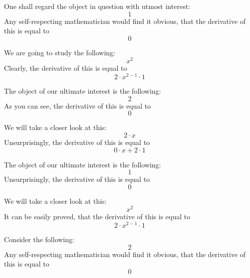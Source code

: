 \documentclass{article}
\begin{document}
One shall regard the object in question with utmost interest:
\begin{equation}
1 
\end{equation}
Any self-respecting mathematician would find it obvious, that the derivative of this is equal to
\begin{equation}
0 
\end{equation}

We are going to study the following:
\begin{equation}
x ^{2 } 
\end{equation}
Clearly, the derivative of this is equal to
\begin{equation}
2 \cdot x ^{2 - 1 } \cdot 1 
\end{equation}

The object of our ultimate interest is the following:
\begin{equation}
2 
\end{equation}
As you can see, the derivative of this is equal to
\begin{equation}
0 
\end{equation}

We will take a closer look at this:
\begin{equation}
2 \cdot x 
\end{equation}
Unsurprisingly, the derivative of this is equal to
\begin{equation}
0 \cdot x + 2 \cdot 1 
\end{equation}

The object of our ultimate interest is the following:
\begin{equation}
1 
\end{equation}
Unsurprisingly, the derivative of this is equal to
\begin{equation}
0 
\end{equation}

We will take a closer look at this:
\begin{equation}
x ^{2 } 
\end{equation}
It can be easily proved, that the derivative of this is equal to
\begin{equation}
2 \cdot x ^{2 - 1 } \cdot 1 
\end{equation}

Consider the following:
\begin{equation}
2 
\end{equation}
Any self-respecting mathematician would find it obvious, that the derivative of this is equal to
\begin{equation}
0 
\end{equation}
\end{document}
